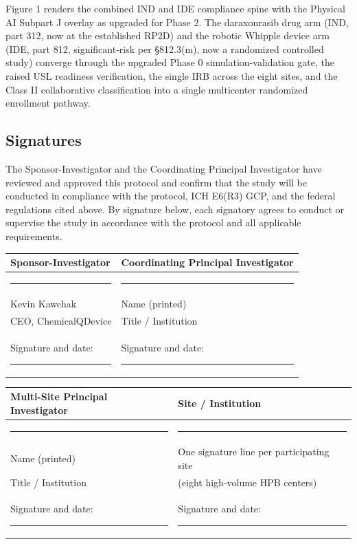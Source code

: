 Figure 1 renders the combined IND and IDE compliance spine with the Physical AI
Subpart J overlay as upgraded for Phase 2. The daraxonrasib drug arm (IND, part
312, now at the established RP2D) and the robotic Whipple device arm (IDE, part
812, significant-risk per \S812.3(m), now a randomized controlled study) converge
through the upgraded Phase 0 simulation-validation gate, the raised USL readiness
verification, the single IRB across the eight sites, and the Class II
collaborative classification into a single multicenter randomized enrollment
pathway.

\subsection{Signatures}

The Sponsor-Investigator and the Coordinating Principal Investigator have reviewed
and approved this protocol and confirm that the study will be conducted in
compliance with the protocol, ICH E6(R3) GCP, and the federal regulations cited
above. By signature below, each signatory agrees to conduct or supervise the study
in accordance with the protocol and all applicable requirements.

\vspace{0.6em}

\noindent\begin{tabularx}{\textwidth}{L{8.2cm} Y}
\toprule
\textbf{Sponsor-Investigator} & \textbf{Coordinating Principal Investigator} \\
\midrule
\vspace{0.1em}\rule{6.0cm}{0.4pt} & \vspace{0em}\rule{6.0cm}{0.4pt} \\
Kevin Kawchak & Name (printed) \\
CEO, ChemicalQDevice & Title / Institution \\[0.8em]
Signature and date: \rule{2.6cm}{0.4pt} & Signature and date: \rule{2.6cm}{0.4pt} \vspace{0.05cm} \\
\bottomrule
\end{tabularx}

\vspace{0.4em}

\noindent\begin{tabularx}{\textwidth}{L{8.2cm} Y}
\toprule
\textbf{Multi-Site Principal Investigator} & \textbf{Site / Institution} \\
\midrule
\vspace{0.1em}\rule{6.0cm}{0.4pt} & \vspace{0em}\rule{6.0cm}{0.4pt} \\
Name (printed) & One signature line per participating site \\
Title / Institution & (eight high-volume HPB centers) \\[0.8em]
Signature and date: \rule{2.6cm}{0.4pt} & Signature and date: \rule{2.6cm}{0.4pt} \vspace{0.05cm} \\
\bottomrule
\end{tabularx}

